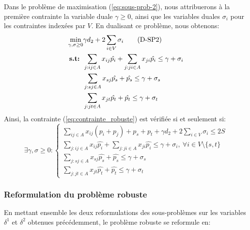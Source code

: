 \documentclass{article}
\begin{document}
Dans le problème de maximisation (\ref{eq:sous-prob-2}), nous attribuerons à la première contrainte la variable duale $\gamma \geq 0$, ainsi que les variables duales $\sigma_{i}$ pour les contraintes indexées par $V$. En dualisant ce problème, nous obtenons:
\begin{align}
  \min_{\gamma, \sigma \geq 0} & \gamma d_2 + 2 \sum_{i \in V} \sigma_i \tag{D-SP2} \label{eq:dual-sous-prob-2}\\
   \textbf{s.t: } & \sum_{j: ij \in A} x_{ij} \hat{p_i} + \sum_{j: ji \in A} x_{ji} \hat{p_i} \leq \gamma + \sigma_i \notag \\
   & \sum_{j: sj \in A} x_{sj} \hat{p_s} + \hat{p_s} \leq \gamma + \sigma_s \notag \\
   & \sum_{j: jt \in A} x_{jt} \hat{p_t} + \hat{p_t} \leq \gamma + \sigma_t \notag
\end{align}
Ainsi, la contrainte (\ref{eq:contrainte_robuste}) est vérifiée si et seulement si: 
$$\exists \gamma, \sigma \geq 0 : 
\begin{cases}
  \sum_{ij \in A} x_{ij} (p_i + p_j) + p_s + p_t + \gamma d_2 + 2 \sum_{i \in V} \sigma_i  \leq 2S\\
  \sum_{j: ij \in A} x_{ij} \hat{p_i} + \sum_{j: ji \in A} x_{ji} \hat{p_i} \leq \gamma + \sigma_i, \ \forall i \in V \setminus{\{s,t\}}  \\
   \sum_{j: sj \in A} x_{sj} \hat{p_s} + \hat{p_s} \leq \gamma + \sigma_s  \\
   \sum_{j: jt \in A} x_{jt} \hat{p_t} + \hat{p_t} \leq \gamma + \sigma_t 
\end{cases}
$$

\subsubsection{Reformulation du problème robuste}

En mettant ensemble les deux reformulations des sous-problèmes sur les variables $\delta^{1}$ et $\delta^{2}$ obtenues précédemment, le problème robuste se reformule en:
\end{document}
